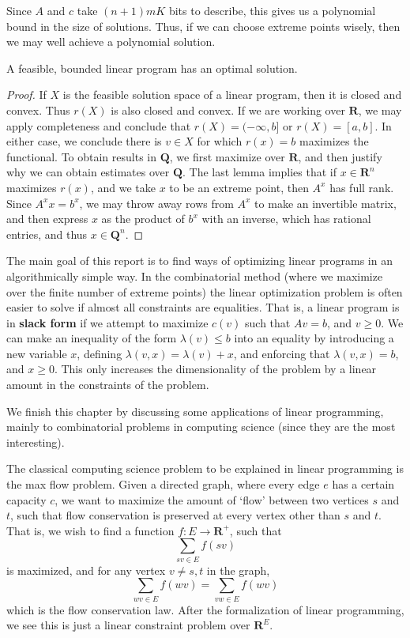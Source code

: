     Since $A$ and $c$ take $(n + 1)mK$ bits to describe, this gives us a polynomial bound in the size of solutions. Thus, if we can choose extreme points wisely, then we may well achieve a polynomial solution.

    \begin{theorem}
        A feasible, bounded linear program has an optimal solution.
    \end{theorem}
    \begin{proof}
        If $X$ is the feasible solution space of a linear program, then it is closed and convex. Thus $r(X)$ is also closed and convex. If we are working over $\mathbf{R}$, we may apply completeness and conclude that $r(X) = (-\infty,b]$ or $r(X) = [a,b]$. In either case, we conclude there is $v \in X$ for which $r(x) = b$ maximizes the functional. To obtain results in $\mathbf{Q}$, we first maximize over $\mathbf{R}$, and then justify why we can obtain estimates over $\mathbf{Q}$. The last lemma implies that if $x \in \mathbf{R}^n$ maximizes $r(x)$, and we take $x$ to be an extreme point, then $A^x$ has full rank. Since $A^x x = b^x$, we may throw away rows from $A^x$ to make an invertible matrix, and then express $x$ as the product of $b^x$ with an inverse, which has rational entries, and thus $x \in \mathbf{Q}^n$.
    \end{proof}

    The main goal of this report is to find ways of optimizing linear programs in an algorithmically simple way. In the combinatorial method (where we maximize over the finite number of extreme points) the linear optimization problem is often easier to solve if almost all constraints are equalities. That is, a linear program is in {\bf slack form} if we attempt to maximize $c(v)$ such that $Av = b$, and $v \geq 0$. We can make an inequality of the form $\lambda(v) \leq b$ into an equality by introducing a new variable $x$, defining $\lambda(v,x) = \lambda(v) + x$, and enforcing that $\lambda(v,x) = b$, and $x \geq 0$. This only increases the dimensionality of the problem by a linear amount in the constraints of the problem.

    We finish this chapter by discussing some applications of linear programming, mainly to combinatorial problems in computing science (since they are the most interesting).

    \begin{example}
        The classical computing science problem to be explained in linear programming is the max flow problem. Given a directed graph, where every edge $e$ has a certain capacity $c$, we want to maximize the amount of `flow' between two vertices $s$ and $t$, such that flow conservation is preserved at every vertex other than $s$ and $t$. That is, we wish to find a function $f: E \to \mathbf{R}^+$, such that
        \[ \sum_{sv \in E} f(sv) \]
        is maximized, and for any vertex $v \neq s,t$ in the graph,
        \[ \sum_{wv \in E} f(wv) = \sum_{vw \in E} f(wv) \]
        which is the flow conservation law. After the formalization of linear programming, we see this is just a linear constraint problem over $\mathbf{R}^E$.
    \end{example}


